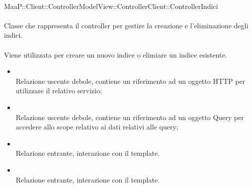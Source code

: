 \\
MaaP::Client::ControllerModelView::ControllerClient::ControllerIndici\\
\\
Classe che rappresenta il controller per gestire la creazione e l'eliminazione degli indici.\\
\\
Viene utilizzata per creare un nuovo indice o elimiare un indice esistente.\\
\begin{itemize}
\item{}\\
Relazione uscente debole, contiene un riferimento ad un oggetto HTTP per utilizzare il relativo servizio;
\item{}\\
Relazione uscente debole, contiene un riferimento ad un oggetto Query per accedere allo scope relativo ai dati relativi alle query;
\item{}\\
Relazione entrante, interazione con il template.
\item{}\\
Relazione entrante, interazione con il template.
\end{itemize}

